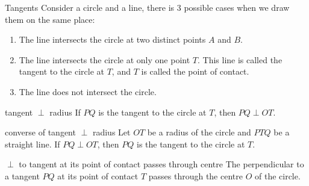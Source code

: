 
\begin{mysubsection}{}
    \begin{definition}[def:]{Tangents}
        Consider a circle and a line, there is 3 possible cases when we draw them on the same place:
        \begin{enumerate}
            \item The line intersects the circle at two distinct points $A$ and $B$.
            \item The line intersects the circle at only one point $T$. This line is called the tangent to the circle at $T$, and $T$ is called the point of contact.
            \item The line does not intersect the circle.
        \end{enumerate}
    \end{definition}

    \begin{theorem}[thm:]{tangent $\perp $ radius}
        If $PQ$ is the tangent to the circle at $T$, then $PQ\perp OT$.
    \end{theorem}

    \righttext[1.5in]{}
    \begin{theorem}[thm:]{converse of tangent $\perp $ radius}
        Let $OT$ be a radius of the circle and $PTQ$ be a straight line. If $PQ\perp OT$, then $PQ$ is the tangent to the circle at $T$.
    \end{theorem}

    \righttext[1.5in]{}
    \begin{theorem}[thm:]{$\perp $ to tangent at its point of contact passes through centre}
        The perpendicular to a tangent $PQ$ at its point of contact $T$ passes through the centre $O$ of the circle.
    \end{theorem}
\end{mysubsection}

\begin{shortque}[]{}
\end{shortque}

